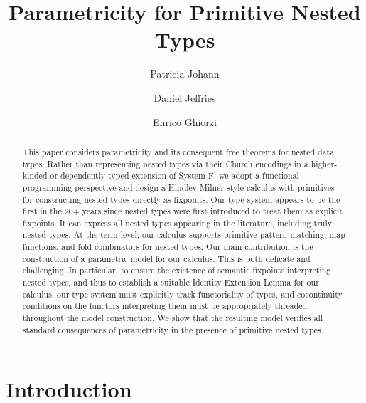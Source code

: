 \documentclass[runningheads]{llncs}
\begin{document}

\title{Parametricity for Primitive Nested Types\vspace*{-0.2in}} 
\author{Patricia Johann \and Daniel
  Jeffries \and Enrico Ghiorzi\vspace*{-0.12in}} 

\maketitle

\begin{abstract}

\vspace*{-0.25in}

This paper considers parametricity and its consequent free theorems
for nested data types. Rather than representing nested types via their
Church encodings in a higher-kinded or dependently typed extension of
System F, we adopt a functional programming perspective and design a
Hindley-Milner-style calculus with primitives for constructing nested
types directly as fixpoints. Our type system appears to be the first
in the 20+ years since nested types were first introduced to treat
them as explicit fixpoints. It can express all nested types appearing
in the literature, including truly nested types. At the term-level,
our calculus supports primitive pattern matching, map functions, and
fold combinators for nested types. Our main contribution is the
construction of a parametric model for our calculus. This is both
delicate and challenging. In particular, to ensure the existence of
semantic fixpoints interpreting nested types, and thus to establish a
suitable Identity Extension Lemma for our calculus, our type system
must explicitly track functoriality of types, and cocontinuity
conditions on the functors interpreting them must be appropriately
threaded throughout the model construction. We show that the
resulting model verifies all standard consequences of parametricity in
the presence of primitive nested types.
\end{abstract}

\vspace*{-0.4in}

\section{Introduction}\label{sec:intro}
\end{document}
